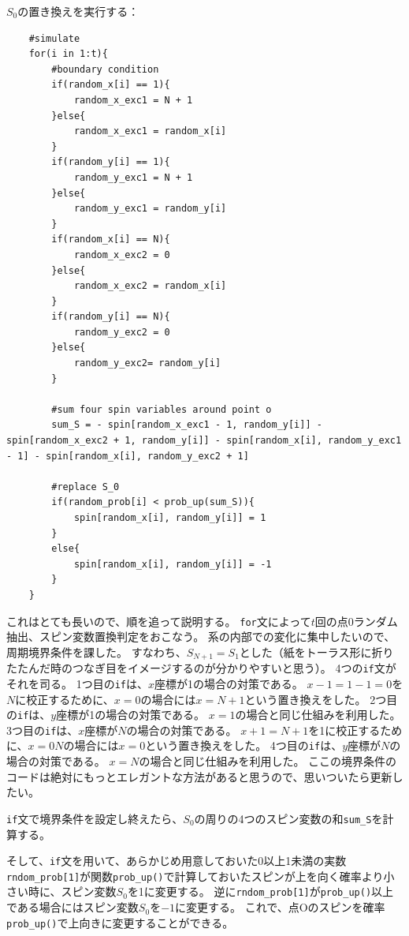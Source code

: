 \documentclass[fontsize = 12pt]{jlreq}
\begin{document}
$S_0$の置き換えを実行する：
\begin{lstlisting}
    #simulate
    for(i in 1:t){
        #boundary condition
        if(random_x[i] == 1){
            random_x_exc1 = N + 1
        }else{
            random_x_exc1 = random_x[i]
        }
        if(random_y[i] == 1){
            random_y_exc1 = N + 1
        }else{
            random_y_exc1 = random_y[i]
        }
        if(random_x[i] == N){
            random_x_exc2 = 0
        }else{
            random_x_exc2 = random_x[i]
        }
        if(random_y[i] == N){
            random_y_exc2 = 0
        }else{
            random_y_exc2= random_y[i]
        }

        #sum four spin variables around point o
        sum_S = - spin[random_x_exc1 - 1, random_y[i]] - spin[random_x_exc2 + 1, random_y[i]] - spin[random_x[i], random_y_exc1 - 1] - spin[random_x[i], random_y_exc2 + 1]
  
        #replace S_0
        if(random_prob[i] < prob_up(sum_S)){
            spin[random_x[i], random_y[i]] = 1
        }
        else{
            spin[random_x[i], random_y[i]] = -1
        }
    }
\end{lstlisting}
これはとても長いので、順を追って説明する。
\texttt{for}文によって$t$回の点0ランダム抽出、スピン変数置換判定をおこなう。
系の内部での変化に集中したいので、周期境界条件を課した。
すなわち、$S_{N+1} = S_1$とした（紙をトーラス形に折りたたんだ時のつなぎ目をイメージするのが分かりやすいと思う）。
4つの\texttt{if}文がそれを司る。
1つ目の\texttt{if}は、$x$座標が1の場合の対策である。
$x -1 = 1 - 1 = 0$を$N$に校正するために、$x = 0$の場合には$x = N+1$という置き換えをした。
2つ目の\texttt{if}は、$y$座標が1の場合の対策である。
$x = 1$の場合と同じ仕組みを利用した。
3つ目の\texttt{if}は、$x$座標が$N$の場合の対策である。
$x + 1 = N + 1$を1に校正するために、$x = 0N$の場合には$x = 0$という置き換えをした。
4つ目の\texttt{if}は、$y$座標が$N$の場合の対策である。
$x = N$の場合と同じ仕組みを利用した。
ここの境界条件のコードは絶対にもっとエレガントな方法があると思うので、思いついたら更新したい。

\texttt{if}文で境界条件を設定し終えたら、$S_0$の周りの4つのスピン変数の和\texttt{sum\_S}を計算する。

そして、\texttt{if}文を用いて、あらかじめ用意しておいた0以上1未満の実数\texttt{rndom\_prob[1]}が関数\texttt{prob\_up()}で計算しておいたスピンが上を向く確率より小さい時に、スピン変数$S_0$を1に変更する。
逆に\texttt{rndom\_prob[1]}が\texttt{prob\_up()}以上である場合にはスピン変数$S_0$を$-1$に変更する。
これで、点Oのスピンを確率\texttt{prob\_up()}で上向きに変更することができる。
\end{document}
